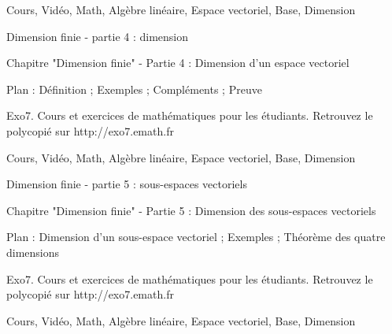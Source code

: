 Cours, Vidéo, Math, Algèbre linéaire, Espace vectoriel, Base, Dimension



Dimension finie - partie 4 : dimension



Chapitre "Dimension finie" - Partie 4 : Dimension d'un espace vectoriel

Plan : Définition ; Exemples ; Compléments ; Preuve

Exo7. Cours et exercices de mathématiques pour les étudiants.
Retrouvez le polycopié sur http://exo7.emath.fr


Cours, Vidéo, Math, Algèbre linéaire, Espace vectoriel, Base, Dimension



Dimension finie - partie 5 : sous-espaces vectoriels



Chapitre "Dimension finie" - Partie 5 : Dimension des sous-espaces vectoriels

Plan : Dimension d'un sous-espace vectoriel ; Exemples ;
Théorème des quatre dimensions

Exo7. Cours et exercices de mathématiques pour les étudiants.
Retrouvez le polycopié sur http://exo7.emath.fr


Cours, Vidéo, Math, Algèbre linéaire, Espace vectoriel, Base, Dimension

